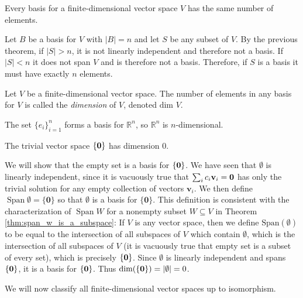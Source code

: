\documentclass[12pt,letterpaper,reqno]{article}
\numberwithin{equation}{section}
\newcommand{\bv}{\mathbf{v}}
\DeclareMathOperator{\Span}{Span}
\begin{document}
\begin{cor}
	Every basis for a finite-dimensional vector space $V$ has the same number of elements.
\end{cor}

\begin{pf}
	Let $B$ be a basis for $V$ with $|B|=n$ and let $S$ be any subset of $V$. By the previous theorem, if $|S|>n$, it is not linearly independent and therefore not a basis. If $|S|<n$ it does not span $V$ and is therefore not a basis. Therefore, if $S$ is a basis it must have exactly $n$ elements.
\end{pf}

\begin{defn}
	Let $V$ be a finite-dimensional vector space. The number of elements in any basis for $V$ is called the \emph{dimension} of $V$, denoted $\text{dim } V$.
\end{defn}

\begin{example}
	The set $\{e_i\}_{i=1}^n$ forms a basis for $\mathbb{R}^n$, so $\mathbb{R}^n$ is $n$-dimensional.
\end{example}

\begin{prop}\label{prop:trivial_vector_space}
The trivial vector space $\{{\bf 0}\}$ has dimension $0$.
\end{prop}

\begin{pf}
	We will show that the empty set is a basis for $\{{\bf 0}\}$. We have seen that $\emptyset$ is linearly independent, since it is vacuously true that $\sum_{i}c_i\bv_i={\bf 0}$ has only the trivial solution for any empty collection of vectors $\bv_i$. We then define $\Span \emptyset=\{\mathbf{0}\}$ so that $\emptyset$ is a basis for $\{\mathbf{0}\}$. This definition is consistent with the characterization of $\Span W$ for a nonempty subset $W \subseteq V$ in Theorem \ref{thm:span_w_is_a_subspace}: If $V$ is any vector space, then we define $\text{Span}(\emptyset)$ to be equal to the intersection of all subspaces of $V$ which contain $\emptyset$, which is the intersection of all subspaces of $V$ (it is vacuously true that empty set is a subset of every set), which is precisely $\{{\bf 0}\}$. Since $\emptyset$ is linearly independent and spans $\{{\bf 0}\}$, it is a basis for $\{{\bf 0}\}$. Thus $\text{dim}(\{{\bf 0}\})=|\emptyset|=0$.
\end{pf}

We will now classify all finite-dimensional vector spaces up to isomorphism.
\end{document}
